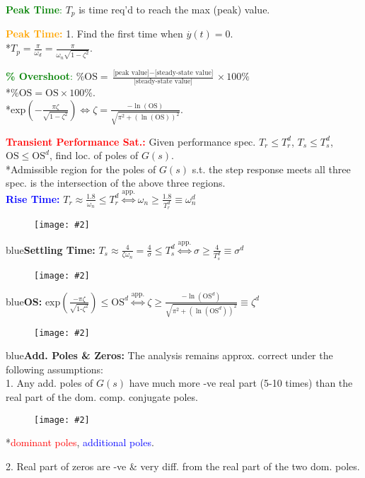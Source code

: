 \documentclass[5pt]{extarticle} %
\newcommand{\customFigure}[3][]{%
    \vspace{-1.5em}
    \begin{figure}[H]
        \centering
        \texttt{[image: \#2]}
    \end{figure}
    \vspace{-1.5em}
}
\begin{document}
\begin{paracol}{3}
{    \textcolor{green}{\textbf{Peak Time}:} $T_p$ is time req'd to reach the max (peak) value.

    \textcolor{orange}{\textbf{Peak Time:}} 1. Find the first time when $\overset{\cdot}{y}(t) = 0$. \\
    *$\boxed{T_p = \frac{\pi}{\omega_d} = \frac{\pi}{\omega_n \sqrt{1 - \zeta^2}}}$.

    \textcolor{green}{\textbf{\% Overshoot}:} $\% \text{OS} = \frac{\text{[peak value]} - \text{[steady-state value]}}{\text{[steady-state value]}} \times 100\%$ \\
    *$\text{\% OS} = \text{OS} \times 100 \%$. \\
    *$\boxed{\text{exp}\left(-\frac{\pi \zeta}{\sqrt{1-\zeta^2}}\right) \iff \zeta = \frac{-\ln(\text{OS})}{\sqrt{\pi^2 + (\ln(\text{OS}))^2}}}$.

    \textcolor{red}{\textbf{Transient Performance Sat.:}} Given performance spec. $T_r \leq T_r^d$, $T_s \leq T_s^d$, $\text{OS} \leq \text{OS}^d$, find loc. of poles of $G(s)$. \\
    *Admissible region for the poles of $G(s)$ s.t. the step response meets all three spec. is the intersection of the above three regions. \\
    \textcolor{blue}{\textbf{Rise Time:}} $T_r \approx \frac{1.8}{\omega_n} \leq T_r^d \overset{\text{app.}}{\iff} \omega_n \geq \frac{1.8}{T_r^d} \equiv \omega_n^d$ 

    \customFigure[0.1]{../Images/L12_0.png}

    \textcolor{blue}{\textbf{Settling Time:}} $T_s \approx \frac{4}{\zeta \omega_n} = \frac{4}{\sigma} \leq T_s^d \overset{\text{app.}}{\iff} \sigma \geq \frac{4}{T_s^d} \equiv \sigma^d$ 
    \customFigure[0.1]{../Images/L12_1.png}

    \textcolor{blue}{\textbf{OS:}} $\text{exp}\left(\frac{-\pi \zeta}{\sqrt{1\text{-}\zeta^2}}\right) \leq \text{OS}^d \overset{\text{app.}}{\iff} \zeta \geq \frac{-\ln(\text{OS}^d)}{\sqrt{\pi^2 + (\ln(\text{OS}^d))^2}} \equiv \zeta^d$ 
    \customFigure[0.1]{../Images/L12_2.png}

    \textcolor{blue}{\textbf{Add. Poles \& Zeros:}} The analysis remains approx. correct under the following assumptions: \\
    1. Any add. poles of $G(s)$ have much more -ve real part (5-10 times) than the real part of the dom. comp. conjugate poles. 
    \customFigure[0.2]{../Images/L12_3.png} \\
    *\textcolor{red}{dominant poles}, \textcolor{blue}{additional poles}.

    2. Real part of zeros are -ve \& very diff. from the real part of the two dom. poles. 


        }
\end{paracol}
\end{document}
